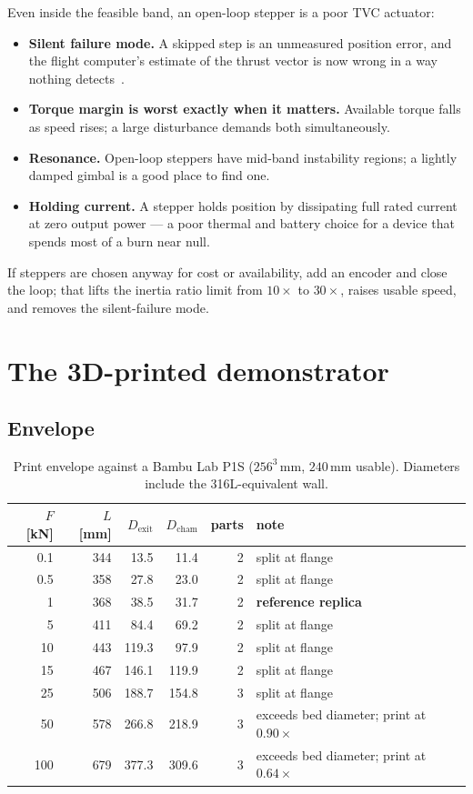 \documentclass[11pt]{article}
\begin{document}
Even inside the feasible band, an open-loop stepper is a poor TVC actuator:

\begin{itemize}[leftmargin=1.4em,itemsep=2pt]
\item \textbf{Silent failure mode.} A skipped step is an unmeasured
position error, and the flight computer's estimate of the thrust vector is
now wrong in a way nothing detects~\cite{orientalmotor}.
\item \textbf{Torque margin is worst exactly when it matters.} Available
torque falls as speed rises; a large disturbance demands both simultaneously.
\item \textbf{Resonance.} Open-loop steppers have mid-band instability
regions; a lightly damped gimbal is a good place to find one.
\item \textbf{Holding current.} A stepper holds position by dissipating full
rated current at zero output power --- a poor thermal and battery choice for
a device that spends most of a burn near null.
\end{itemize}

If steppers are chosen anyway for cost or availability, add an encoder and
close the loop; that lifts the inertia ratio limit from $10\times$ to
$30\times$, raises usable speed, and removes the silent-failure mode.

\section{The 3D-printed demonstrator}

\subsection{Envelope}

\begin{table}[H]\centering\small
\caption{Print envelope against a Bambu Lab P1S ($256^3$\,mm, $240$\,mm
usable). Diameters include the 316L-equivalent wall.}
\begin{tabular}{r r r r r l}
\toprule
$F$ [kN] & $L$ [mm] & $D_{\text{exit}}$ & $D_{\text{cham}}$ & parts & note\\
\midrule
0.1  & 344 &  13.5 &  11.4 & 2 & split at flange\\
0.5  & 358 &  27.8 &  23.0 & 2 & split at flange\\
1    & 368 &  38.5 &  31.7 & 2 & \textbf{reference replica}\\
5    & 411 &  84.4 &  69.2 & 2 & split at flange\\
10   & 443 & 119.3 &  97.9 & 2 & split at flange\\
15   & 467 & 146.1 & 119.9 & 2 & split at flange\\
25   & 506 & 188.7 & 154.8 & 3 & split at flange\\
50   & 578 & 266.8 & 218.9 & 3 & exceeds bed diameter; print at $0.90\times$\\
100  & 679 & 377.3 & 309.6 & 3 & exceeds bed diameter; print at $0.64\times$\\
\bottomrule
\end{tabular}
\end{table}
\end{document}
